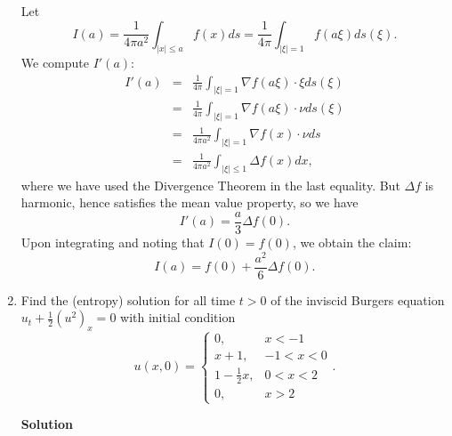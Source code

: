 \documentclass{article}
\begin{document}
\begin{enumerate}
Let
\[I(a) = \frac{1}{4 \pi a^2} \int_{|x| \leq a} f(x) ds = \frac{1}{4 \pi} \int_{|\xi| = 1} f(a\xi) ds(\xi).\]
We compute \(I'(a)\):
\begin{eqnarray*}
I'(a) & = & \frac{1}{4 \pi} \int_{|\xi| = 1} \nabla f(a\xi) \cdot \xi ds(\xi) \\
      & = & \frac{1}{4 \pi} \int_{|\xi| = 1} \nabla f(a\xi) \cdot \nu ds(\xi) \\
      & = & \frac{1}{4 \pi a^2} \int_{|\xi| = 1} \nabla f(x) \cdot \nu ds \\
      & = & \frac{1}{4 \pi a^2} \int_{|\xi| \leq 1} \Delta f(x) dx,
\end{eqnarray*}
where we have used the Divergence Theorem in the last equality.  But \(\Delta f\) is harmonic, hence satisfies the mean value property, so we have
\[I'(a) = \frac{a}{3} \Delta f(0).\]
Upon integrating and noting that \(I(0) = f(0)\), we obtain the claim:
\[I(a) = f(0) + \frac{a^2}{6} \Delta f(0).\]



\item Find the (entropy) solution for all time \(t > 0\) of the inviscid Burgers equation \(u_t + \frac{1}{2} (u^2)_x = 0\) with initial condition
\[u(x,0) = \begin{cases} 0, & x < -1 \\ x + 1, & -1 < x < 0 \\ 1 - \frac{1}{2} x, & 0 < x < 2 \\ 0, & x > 2 \end{cases}.\]

{\bf Solution}


\end{enumerate}
\end{document}
